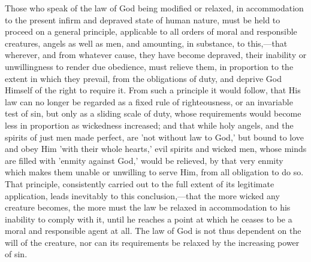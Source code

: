 \documentclass[
]{book}
\begin{document}
Those who speak of the law of God being modified or relaxed, in accommodation to the present infirm and depraved state of human nature, must be held to proceed on a general principle, applicable to all orders of moral and responsible creatures, angels as well as men, and amounting, in substance, to this,---that wherever, and from whatever cause, they have become depraved, their inability or unwillingness to render due obedience, must relieve them, in proportion to the extent in which they prevail, from the obligations of duty, and deprive God Himself of the right to require it. From such a principle it would follow, that His law can no longer be regarded as a fixed rule of righteousness, or an invariable test of sin, but only as a sliding scale of duty, whose requirements would become less in proportion as wickedness increased; and that while holy angels, and the spirits of just men made perfect, are 'not without law to God,' but bound to love and obey Him 'with their whole hearts,' evil spirits and wicked men, whose minds are filled with 'enmity against God,' would be relieved, by that very enmity which makes them unable or unwilling to serve Him, from all obligation to do so. That principle, consistently carried out to the full extent of its legitimate application, leads inevitably to this conclusion,---that the more wicked any creature becomes, the more must the law be relaxed in accommodation to his inability to comply with it, until he reaches a point at which he ceases to be a moral and responsible agent at all. The law of God is not thus dependent on the will of the creature, nor can its requirements be relaxed by the increasing power of sin.
\end{document}
